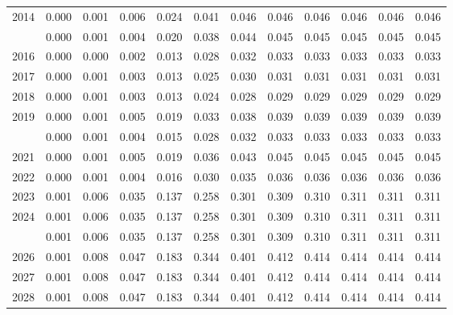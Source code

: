\documentclass[
]{article}
\begin{document}
\begin{longtable}[t]{lrrrrrrrrrrr}
2014 & 0.000 & 0.001 & 0.006 & 0.024 & 0.041 & 0.046 & 0.046 & 0.046 & 0.046 & 0.046 & 0.046\\
\addlinespace
2015 & 0.000 & 0.001 & 0.004 & 0.020 & 0.038 & 0.044 & 0.045 & 0.045 & 0.045 & 0.045 & 0.045\\
2016 & 0.000 & 0.000 & 0.002 & 0.013 & 0.028 & 0.032 & 0.033 & 0.033 & 0.033 & 0.033 & 0.033\\
2017 & 0.000 & 0.001 & 0.003 & 0.013 & 0.025 & 0.030 & 0.031 & 0.031 & 0.031 & 0.031 & 0.031\\
2018 & 0.000 & 0.001 & 0.003 & 0.013 & 0.024 & 0.028 & 0.029 & 0.029 & 0.029 & 0.029 & 0.029\\
2019 & 0.000 & 0.001 & 0.005 & 0.019 & 0.033 & 0.038 & 0.039 & 0.039 & 0.039 & 0.039 & 0.039\\
\addlinespace
2020 & 0.000 & 0.001 & 0.004 & 0.015 & 0.028 & 0.032 & 0.033 & 0.033 & 0.033 & 0.033 & 0.033\\
2021 & 0.000 & 0.001 & 0.005 & 0.019 & 0.036 & 0.043 & 0.045 & 0.045 & 0.045 & 0.045 & 0.045\\
2022 & 0.000 & 0.001 & 0.004 & 0.016 & 0.030 & 0.035 & 0.036 & 0.036 & 0.036 & 0.036 & 0.036\\
2023 & 0.001 & 0.006 & 0.035 & 0.137 & 0.258 & 0.301 & 0.309 & 0.310 & 0.311 & 0.311 & 0.311\\
2024 & 0.001 & 0.006 & 0.035 & 0.137 & 0.258 & 0.301 & 0.309 & 0.310 & 0.311 & 0.311 & 0.311\\
\addlinespace
2025 & 0.001 & 0.006 & 0.035 & 0.137 & 0.258 & 0.301 & 0.309 & 0.310 & 0.311 & 0.311 & 0.311\\
2026 & 0.001 & 0.008 & 0.047 & 0.183 & 0.344 & 0.401 & 0.412 & 0.414 & 0.414 & 0.414 & 0.414\\
2027 & 0.001 & 0.008 & 0.047 & 0.183 & 0.344 & 0.401 & 0.412 & 0.414 & 0.414 & 0.414 & 0.414\\
2028 & 0.001 & 0.008 & 0.047 & 0.183 & 0.344 & 0.401 & 0.412 & 0.414 & 0.414 & 0.414 & 0.414\\*
\end{longtable}
\end{document}
